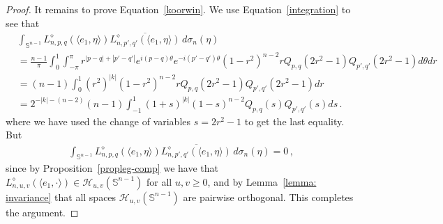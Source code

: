 \documentclass[10pt,a4paper]{amsart}
\begin{document}
\begin{proof}
It remains to prove Equation~\eqref{koorwin}. We use Equation~\eqref{integration} to see that
  \begin{align*}
    &
  \int_{\mathbb{S}^{n-1}}
    L_{n,p,q}^{\diamond} (\langle e_1, \eta \rangle)  \overline{
L_{n,p',q'}^{\diamond}(\langle e_1, \eta \rangle)}
    \,d\sigma_n(\eta)
    \\&
  =
  \frac{n-1}{\pi}\int_{0}^{1} \int_{-\pi}^{\pi}
    r^{|p-q|+|p'-q'|}  e^{i (p-q)\theta} e^{-i (p'-q')\theta} (1-r^2)^{n-2} r
    Q_{p,q} (2r^2 -1)  Q_{p',q'} (2r^2 -1)
  d\theta dr
  \\&
  =
  (n-1)\int_{0}^{1}
    (r^2)^{|k|}  (1-r^2)^{n-2} r
    Q_{p,q} (2r^2 -1)  Q_{p',q'} (2r^2 -1)
  dr
  \\&
  =
  2^{-|k|-(n-2)} (n-1)  \int_{-1}^{1} (1+s)^{|k|} (1-s)^{n-2} Q_{p,q}(s) Q_{p',q'} (s) ds\,.
    \end{align*}
where we have used the change of variables  $s=2r^2-1 $ to get the last equality.
    But
      \begin{align*}
      \int_{\mathbb{S}^{n-1}}
    L_{n,p,q}^{\diamond} (\langle e_1, \eta \rangle)  \overline{
L_{n,p',q'}^{\diamond} (\langle e_1, \eta \rangle)}
    \,d\sigma_n(\eta) = 0\,,
    \end{align*}
  since by Proposition~\ref{propleg-comp} we have that
   $L_{n,u,v}^{\diamond} (\langle e_1, \cdot \rangle) \in \mathcal{H}_{u,v}(\mathbb{S}^{n-1})  $ for all  $u,v \geq 0 $, and by Lemma~\ref{lemma: invariance}  that all spaces
   $\mathcal{H}_{u,v}(\mathbb{S}^{n-1})  $ are pairwise orthogonal. This  completes the argument.    \end{proof}
\end{document}
